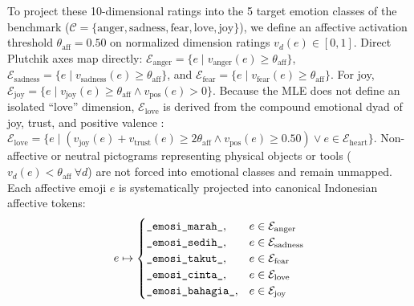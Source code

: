 \documentclass{ieeeaccess}
\begin{document}
To project these 10-dimensional ratings into the 5 target emotion classes of the benchmark ($\mathcal{C} = \{\text{anger}, \text{sadness}, \text{fear}, \text{love}, \text{joy}\}$), we define an affective activation threshold $\theta_{\text{aff}} = 0.50$ on normalized dimension ratings $v_d(e) \in [0, 1]$. Direct Plutchik axes map directly: $\mathcal{E}_{\text{anger}} = \{e \mid v_{\text{anger}}(e) \ge \theta_{\text{aff}}\}$, $\mathcal{E}_{\text{sadness}} = \{e \mid v_{\text{sadness}}(e) \ge \theta_{\text{aff}}\}$, and $\mathcal{E}_{\text{fear}} = \{e \mid v_{\text{fear}}(e) \ge \theta_{\text{aff}}\}$. For joy, $\mathcal{E}_{\text{joy}} = \{e \mid v_{\text{joy}}(e) \ge \theta_{\text{aff}} \land v_{\text{pos}}(e) > 0\}$. Because the MLE does not define an isolated ``love'' dimension, $\mathcal{E}_{\text{love}}$ is derived from the compound emotional dyad of joy, trust, and positive valence \cite{godard2022multidimensional}: $\mathcal{E}_{\text{love}} = \{e \mid (v_{\text{joy}}(e) + v_{\text{trust}}(e) \ge 2\theta_{\text{aff}} \land v_{\text{pos}}(e) \ge 0.50) \lor e \in \mathcal{E}_{\text{heart}}\}$. Non-affective or neutral pictograms representing physical objects or tools ($v_d(e) < \theta_{\text{aff}} \ \forall d$) are not forced into emotional classes and remain unmapped. Each affective emoji $e$ is systematically projected into canonical Indonesian affective tokens:
\begin{equation}
\label{eq:emoji_mapping}
    e \mapsto \begin{cases}
        \text{\texttt{\_emosi\_marah\_}}, & e \in \mathcal{E}_{\text{anger}} \\
        \text{\texttt{\_emosi\_sedih\_}}, & e \in \mathcal{E}_{\text{sadness}} \\
        \text{\texttt{\_emosi\_takut\_}}, & e \in \mathcal{E}_{\text{fear}} \\
        \text{\texttt{\_emosi\_cinta\_}}, & e \in \mathcal{E}_{\text{love}} \\
        \text{\texttt{\_emosi\_bahagia\_}}, & e \in \mathcal{E}_{\text{joy}}
    \end{cases}
\end{equation}
\end{document}
